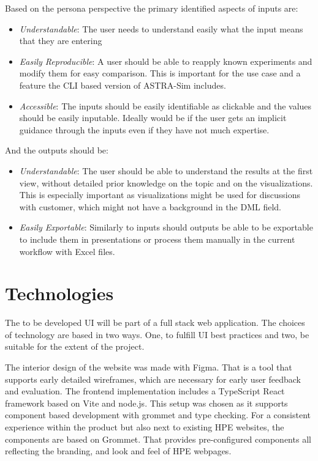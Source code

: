 Based on the persona perspective the primary identified aspects of inputs are:
\begin{itemize}
  \item \textit{Understandable}: The user needs to understand easily what the input means that they are entering
  \item \textit{Easily Reproducible}: A user should be able to reapply known experiments and modify them for easy comparison. This is important for the use case and a feature the \ac{CLI} based version of ASTRA-Sim includes.
  \item \textit{Accessible}: The inputs should be easily identifiable as clickable and the values should be easily inputable. Ideally would be if the user gets an implicit guidance through the inputs even if they have not much expertise.
\end{itemize}

And the outputs should be:
\begin{itemize}
  \item \textit{Understandable}: The user should be able to understand the results at the first view, without detailed prior knowledge on the topic and on the visualizations. This is especially important as visualizations might be used for discussions with customer, which might not have a background in the \ac{DML} field.
  \item \textit{Easily Exportable}: Similarly to inputs should outputs be able to be exportable to include them in presentations or process them manually in the current workflow with Excel files.
\end{itemize}



\section{Technologies}
The to be developed \ac{UI} will be part of a full stack web application. The choices of technology are based in two ways. One, to fulfill \ac{UI} best practices and two, be suitable for the extent of the project.

The interior design of the website was made with Figma. That is a tool that supports early detailed wireframes, which are necessary for early user feedback and evaluation.
The frontend implementation includes a TypeScript React framework based on Vite and node.js. %
This setup was chosen as it supports component based development with grommet and type checking. For a consistent experience within the product but also next to existing \ac{HPE} websites, the components are based on Grommet. That provides pre-configured components all reflecting the branding, and look and feel of \ac{HPE} webpages.

